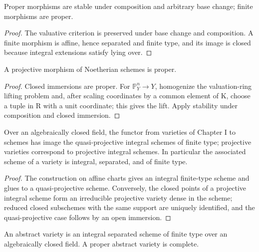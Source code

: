 \begin{corollary}
\label{cor:II-4-8}
Proper morphisms are stable under composition and arbitrary base change; finite morphisms are proper.
\end{corollary}
\begin{proof}
The valuative criterion is preserved under base change and composition. A finite morphism is affine,
hence separated and finite type, and its image is closed because integral extensions satisfy lying over.
\end{proof}

\begin{theorem}
\label{thm:II-4-9}
A projective morphism of Noetherian schemes is proper.
\end{theorem}
\begin{proof}
Closed immersions are proper. For $\mathbb P^n_Y\to Y$, homogenize the valuation-ring lifting problem
and, after scaling coordinates by a common element of K, choose a tuple in R with a unit coordinate;
this gives the lift. Apply stability under composition and closed immersion.
\end{proof}

\begin{proposition}
\label{prop:II-4-10}
Over an algebraically closed field, the functor from varieties of Chapter I to schemes has image
the quasi-projective integral schemes of finite type; projective varieties correspond to projective
integral schemes. In particular the associated scheme of a variety is integral, separated, and of
finite type.
\end{proposition}
\begin{proof}
The construction on affine charts gives an integral finite-type scheme and glues to a
quasi-projective scheme. Conversely, the closed points of a projective integral scheme form an
irreducible projective variety dense in the scheme; reduced closed subschemes with the same support
are uniquely identified, and the quasi-projective case follows by an open immersion.
\end{proof}

\begin{definition}
\label{def:II-4-10-variety}
An abstract variety is an integral separated scheme of finite type over an algebraically closed
field. A proper abstract variety is complete.
\end{definition}

